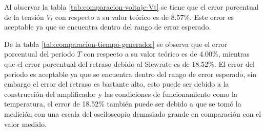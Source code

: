 Al observar la tabla \ref{tab:comparacion-voltaje-Vt} se tiene que el error porcentual de la tensión $V_t$ con respecto a su valor teórico es de 8.57\%. Este error es aceptable ya que se encuentra dentro del rango de error esperado.

De la tabla \ref{tab:comparacion-tiempo-generador} se observa que el error porcentual del periodo $T$ con respecto a su valor teórico es de 4.00\%, mientras que el error porcentual del retraso debido al Slewrate es de 18.52\%. El error del periodo es aceptable ya que se encuentra dentro del rango de error esperado, sin embargo el error del retraso es bastante alto, esto puede ser debido a la construcción del amplificador y las condiciones de funcionamiento como la temperatura, el error de 18.52\% también puede ser debido a que se tomó la medición con una escala del osciloscopio demasiado grande en comparación con el valor medido.
